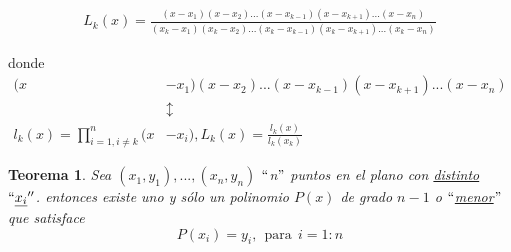 \begin{align*}
L_{k}(x) = \frac{(x-x_{1})(x - x_{2})...(x- x_{k-1})(x - x_{k+1})...(x - x_{n})}{(x_{k} -x_{1})(x_{k} - x_{2})...(x_{k}- x_{k-1})(x_{k} - x_{k+1})...(x_{k} - x_{n})}
\end{align*}





\newpage

donde 
\begin{align*}
 (x&-x_{1})(x - x_{2})...(x- x_{k-1})(x - x_{k+1})...(x - x_{n}) \\
 &\updownarrow\\
 l_{k}(x) = \prod_{i=1,i \neq k}^{n}  (x & -x_{i}), L_{k}(x)= \frac{l_{k}(x)}{l_{k}(x_{k})}
\end{align*}
 \hrulefill
 
\newtheorem*{thm}{Teorema}
\begin{thm}
Sea $(x_{1},y_{1}),...,(x_{n},y_{n})$ $``$n$"$  puntos en el plano con \underline{distinto} $``\underline{x_{i}}''$. entonces existe uno y sólo un 
polinomio $P(x)$ de grado $n-1$ o $``$\underline{menor}$"$  que satisface
$$
P(x_{i}) = y_{i}, \ \ \text{para} \ \  i=1:n
$$
\end{thm}



